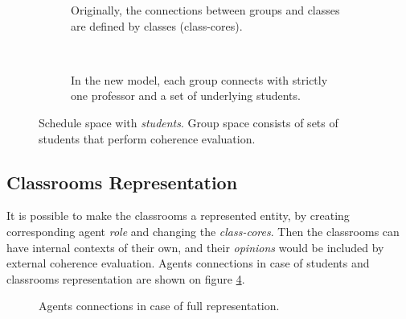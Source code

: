 \documentclass[ThesisDoc]{subfiles}
\providecommand{\rootdir}{.}
\begin{document}
\begin{figure}[h]
  \begin{subfigure}{0.36\textwidth}
    \resizebox{\linewidth}{!}{
      
    }
    \caption{Originally, the connections between groups and classes are
             defined by classes (class-cores).}
  \end{subfigure}
  ~
  \begin{subfigure}{0.64\textwidth}
    \resizebox{\linewidth}{!}{
      
    }
    \caption{In the new model, each group connects with strictly one professor
             and a set of underlying students.}
    \label{}
  \end{subfigure}
  \caption{}
  \label{fig:ConnectionMatrixDiff}
\end{figure}


\begin{figure}[b]
  \centering
  \resizebox{\textwidth}{!}{
    
  }
  \caption{Schedule space with \emph{students}. Group space consists of
           sets of students that perform coherence evaluation. }
  \label{fig:ScheduleHypercube-S}
\end{figure}


\subsection{Classrooms Representation}
It is possible to make the classrooms a represented entity, by creating
corresponding agent \emph{role} and changing the \emph{class-cores}.
Then the classrooms can have internal contexts of their own, and their
\emph{opinions} would be included by external coherence evaluation.
Agents connections in case of students and classrooms representation are shown
on figure \ref{fig:ConnectionMatrixAll}.
\begin{figure}[h]
  \resizebox{\textwidth}{!}{
    
  }
  \caption{Agents connections in case of full representation.}
  \label{fig:ConnectionMatrixAll}
\end{figure}
\end{document}
